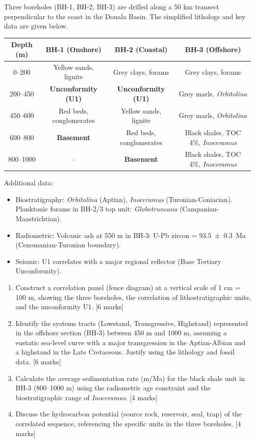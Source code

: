 \documentclass[11pt]{article}
\newcommand{\cle}[1]{{\popxbold\color{popdark}#1}}
\begin{document}
\begin{exercice}
Three boreholes (BH-1, BH-2, BH-3) are drilled along a 50 km transect perpendicular to the coast in the \cle{Douala Basin}. The simplified lithologs and key data are given below.

\begin{center}
\begin{tabular}{|c|c|c|c|}\hline
\textbf{Depth (m)} & \textbf{BH-1 (Onshore)} & \textbf{BH-2 (Coastal)} & \textbf{BH-3 (Offshore)} \\ \hline
0--200 & Yellow sands, lignite & Grey clays, forams & Grey clays, forams \\ \hline
200--450 & \textbf{Unconformity (U1)} & \textbf{Unconformity (U1)} & Grey marls, \emph{Orbitolina} \\ \hline
450--600 & Red beds, conglomerates & Yellow sands, lignite & Grey marls, \emph{Orbitolina} \\ \hline
600--800 & \textbf{Basement} & Red beds, conglomerates & Black shales, TOC 4\%, \emph{Inoceramus} \\ \hline
800--1000 & -- & \textbf{Basement} & Black shales, TOC 4\%, \emph{Inoceramus} \\ \hline
\end{tabular}
\end{center}

Additional data:
\begin{itemize}
\item Biostratigraphy: \emph{Orbitolina} (Aptian), \emph{Inoceramus} (Turonian-Coniacian). Planktonic forams in BH-2/3 top unit: \emph{Globotruncana} (Campanian-Maastrichtian).
\item Radiometric: Volcanic ash at 550 m in BH-3: U-Pb zircon = \SI{93.5 \pm 0.3}{Ma} (Cenomanian-Turonian boundary).
\item Seismic: U1 correlates with a major regional reflector (Base Tertiary Unconformity).
\end{itemize}

\begin{enumerate}
\item Construct a correlation panel (fence diagram) at a vertical scale of 1 cm = 100 m, showing the three boreholes, the correlation of lithostratigraphic units, and the unconformity U1. [6 marks]
\item Identify the \cle{systems tracts} (Lowstand, Transgressive, Highstand) represented in the offshore section (BH-3) between 450 m and 1000 m, assuming a eustatic sea-level curve with a major transgression in the Aptian-Albian and a highstand in the Late Cretaceous. Justify using the lithology and fossil data. [6 marks]
\item Calculate the average sedimentation rate (m/Ma) for the black shale unit in BH-3 (800--1000 m) using the radiometric age constraint and the biostratigraphic range of \emph{Inoceramus}. [4 marks]
\item Discuss the hydrocarbon potential (source rock, reservoir, seal, trap) of the correlated sequence, referencing the specific units in the three boreholes. [4 marks]
\end{enumerate}
\end{exercice}
\end{document}

